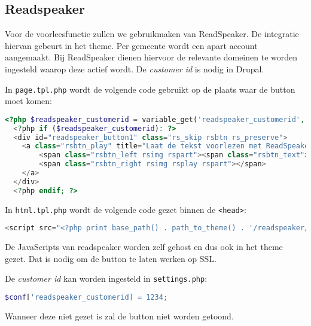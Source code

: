 \subsection{Readspeaker}\label{readspeaker}

Voor de voorleesfunctie zullen we gebruikmaken van ReadSpeaker. De integratie hiervan gebeurt in het theme. Per gemeente wordt een apart account aangemaakt. Bij ReadSpeaker dienen hiervoor de relevante domeinen te worden ingesteld waarop deze actief wordt. De \emph{customer id} is nodig in Drupal.

In \texttt{page.tpl.php} wordt de volgende code gebruikt op de plaats waar de button moet komen:

\begin{lstlisting}[language=PHP]
  <?php $readspeaker_customerid = variable_get('readspeaker_customerid', 0); ?>
  <?php if ($readspeaker_customerid): ?>
  <div id="readspeaker_button1" class="rs_skip rsbtn rs_preserve">
    <a class="rsbtn_play" title="Laat de tekst voorlezen met ReadSpeaker" href="//app.eu.readspeaker.com/cgi-bin/rsent?customerid=<?php print $readspeaker_customerid; ?>&amp;lang=nl_nl&amp;readid=main&amp;url=<?php echo urlencode($_SERVER['HTTP_HOST'] . $_SERVER['REQUEST_URI']); ?>">
        <span class="rsbtn_left rsimg rspart"><span class="rsbtn_text"><span>Lees voor</span></span></span>
        <span class="rsbtn_right rsimg rsplay rspart"></span>
    </a>
  </div>
  <?php endif; ?>
\end{lstlisting}

In \texttt{html.tpl.php} wordt de volgende code gezet binnen de \texttt{\textless head\textgreater}:
\begin{lstlisting}[language=PHP]
<script src="<?php print base_path() . path_to_theme() . '/readspeaker/ReadSpeaker.js?pids=embhl'; ?>"></script>
\end{lstlisting}

De JavaScripts van readspeaker worden zelf gehost en dus ook in het theme gezet. Dat is nodig om de button te laten werken op SSL.

De \emph{customer id} kan worden ingesteld in \texttt{settings.php}:
\begin{lstlisting}[language=PHP]
$conf['readspeaker_customerid] = 1234;
\end{lstlisting}

Wanneer deze niet gezet is zal de button niet worden getoond.